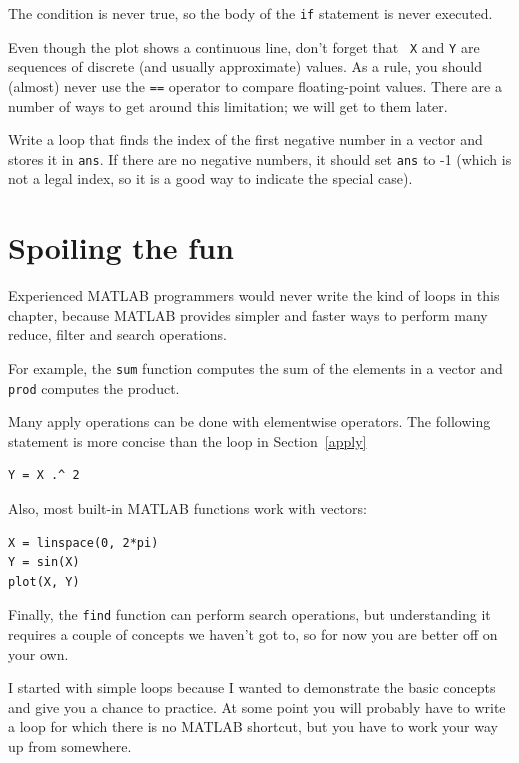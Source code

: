 \documentclass{book}
\begin{document}
The condition is never true, so the body of the {\tt if} statement
is never executed.

Even though the plot shows a continuous line, don't forget that {\tt
X} and {\tt Y} are sequences of discrete (and usually approximate)
values.  As a rule, you should (almost) never use the {\tt ==}
operator to compare floating-point values.  There are a number of ways
to get around this limitation; we will get to them later.

\begin{ex}
Write a loop that finds the index of the first
negative number in a vector and stores it in {\tt ans}.  If there are
no negative numbers, it should set {\tt ans} to -1 (which is not
a legal index, so it is a good way to indicate the special case).
\end{ex}



\section{Spoiling the fun}

Experienced MATLAB programmers would never write the kind of loops
in this chapter, because MATLAB provides simpler and faster ways to
perform many reduce, filter and search operations.

For example, the {\tt sum} function computes the sum of the elements
in a vector and {\tt prod} computes the product.

Many apply operations can be done with elementwise operators.  The
following statement is more concise than the loop in
Section~\ref{apply}

\begin{verbatim}
Y = X .^ 2
\end{verbatim}

Also, most built-in MATLAB functions work with vectors:

\begin{verbatim}
X = linspace(0, 2*pi)
Y = sin(X)
plot(X, Y)
\end{verbatim}

Finally, the {\tt find} function can perform search operations, but
understanding it requires a couple of concepts we haven't got to, so
for now you are better off on your own.

I started with simple loops because I wanted to demonstrate the basic
concepts and give you a chance to practice.  At some point you will
probably have to write a loop for which there is no 
MATLAB shortcut, but you have to work your way up from somewhere.
\end{document}
